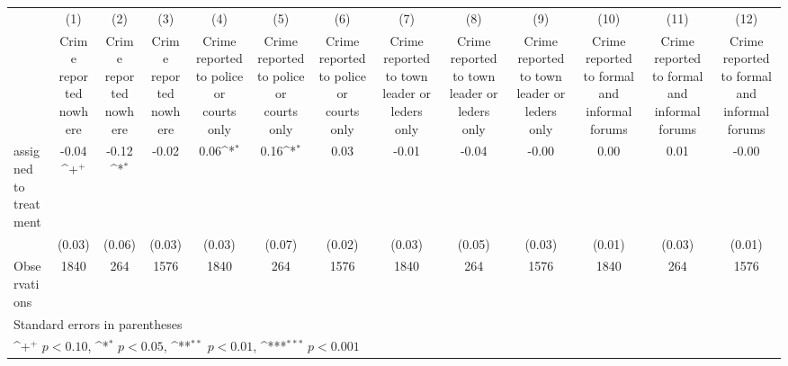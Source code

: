 {
\def\sym#1{\ifmmode^{#1}\else\(^{#1}\)\fi}
\begin{tabular}{l*{12}{c}}
\hline\hline
                    &\multicolumn{1}{c}{(1)}&\multicolumn{1}{c}{(2)}&\multicolumn{1}{c}{(3)}&\multicolumn{1}{c}{(4)}&\multicolumn{1}{c}{(5)}&\multicolumn{1}{c}{(6)}&\multicolumn{1}{c}{(7)}&\multicolumn{1}{c}{(8)}&\multicolumn{1}{c}{(9)}&\multicolumn{1}{c}{(10)}&\multicolumn{1}{c}{(11)}&\multicolumn{1}{c}{(12)}\\
                    &\multicolumn{1}{c}{Crime reported nowhere}&\multicolumn{1}{c}{Crime reported nowhere}&\multicolumn{1}{c}{Crime reported nowhere}&\multicolumn{1}{c}{Crime reported to police or courts only}&\multicolumn{1}{c}{Crime reported to police or courts only}&\multicolumn{1}{c}{Crime reported to police or courts only}&\multicolumn{1}{c}{Crime reported to town leader or leders only}&\multicolumn{1}{c}{Crime reported to town leader or leders only}&\multicolumn{1}{c}{Crime reported to town leader or leders only}&\multicolumn{1}{c}{Crime reported to formal and informal forums}&\multicolumn{1}{c}{Crime reported to formal and informal forums}&\multicolumn{1}{c}{Crime reported to formal and informal forums}\\
\hline
assigned to treatment&       -0.04\sym{+}  &       -0.12\sym{*}  &       -0.02         &        0.06\sym{*}  &        0.16\sym{*}  &        0.03         &       -0.01         &       -0.04         &       -0.00         &        0.00         &        0.01         &       -0.00         \\
                    &      (0.03)         &      (0.06)         &      (0.03)         &      (0.03)         &      (0.07)         &      (0.02)         &      (0.03)         &      (0.05)         &      (0.03)         &      (0.01)         &      (0.03)         &      (0.01)         \\
\hline
Observations        &        1840         &         264         &        1576         &        1840         &         264         &        1576         &        1840         &         264         &        1576         &        1840         &         264         &        1576         \\
\hline\hline
\multicolumn{13}{l}{\footnotesize Standard errors in parentheses}\\
\multicolumn{13}{l}{\footnotesize \sym{+} \(p<0.10\), \sym{*} \(p<0.05\), \sym{**} \(p<0.01\), \sym{***} \(p<0.001\)}\\
\end{tabular}
}
